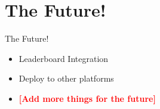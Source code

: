 \documentclass[aspectratio=169]{beamer}
\newcommand{\todo}[1]{\textcolor{red}{\textbf{[#1]}}}
\begin{document}
\section{The Future!}

\begin{frame}{The Future!}
	\begin{itemize}
		
		\item Leaderboard Integration

		\item Deploy to other platforms

		\item \todo{Add more things for the future}

	\end{itemize}
\end{frame}

\end{document}
